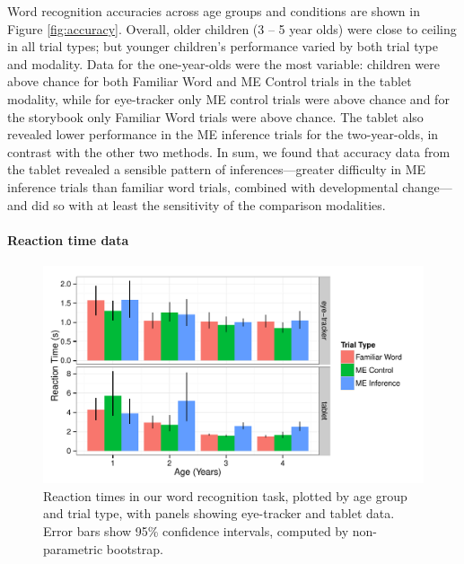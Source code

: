 \documentclass[man,noapacite]{apa2}
\begin{document}
Word recognition accuracies across age groups and conditions are shown in Figure \ref{fig:accuracy}. Overall, older children (3 -- 5 year olds) were close to ceiling in all trial types; but younger children's performance varied by both trial type and modality. Data for the one-year-olds were the most variable: children were above chance for both Familiar Word and ME Control trials in the tablet modality, while for eye-tracker only ME control trials were above chance and for the storybook only Familiar Word trials were above chance. The tablet also revealed lower performance in the ME inference trials for the two-year-olds, in contrast with the other two methods. In sum, we found that accuracy data from the tablet revealed a sensible pattern of inferences---greater difficulty in ME inference trials than familiar word trials, combined with developmental change---and did so with at least the sensitivity of the comparison modalities. 

\paragraph{Reaction time data}

\begin{figure}[t] 
  \begin{center} 
    \includegraphics[width=5in]{figures/rt.pdf} 
    \caption{\label{fig:rt} Reaction times in our word recognition task, plotted by age group and trial type, with panels showing eye-tracker and tablet data. Error bars show 95\% confidence intervals, computed by non-parametric bootstrap.}
  \end{center} 
\end{figure}
\end{document}
